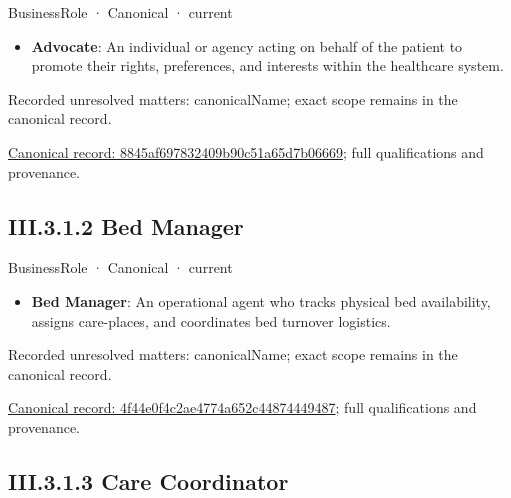 \label{element:8845af697832409b90c51a65d7b06669}
{\small BusinessRole · Canonical · current}\par

\begin{itemize}


\item \textbf{Advocate}: An individual or agency acting on behalf of the patient to promote their rights, preferences, and interests within the healthcare system.

\end{itemize}

{\small Recorded unresolved matters: canonicalName; exact scope remains in the canonical record.}\par
{\footnotesize \href{../../../../continuum/business/business-role/8845af697832409b90c51a65d7b06669.md}{Canonical record: 8845af697832409b90c51a65d7b06669}; full qualifications and provenance.}\par
\subsection*{III.3.1.2 Bed Manager}
\label{navigation:III.3.1.2}

\label{element:4f44e0f4c2ae4774a652c44874449487}
{\small BusinessRole · Canonical · current}\par

\begin{itemize}


\item \textbf{Bed Manager}: An operational agent who tracks physical bed availability, assigns care-places, and coordinates bed turnover logistics.

\end{itemize}

{\small Recorded unresolved matters: canonicalName; exact scope remains in the canonical record.}\par
{\footnotesize \href{../../../../continuum/business/business-role/4f44e0f4c2ae4774a652c44874449487.md}{Canonical record: 4f44e0f4c2ae4774a652c44874449487}; full qualifications and provenance.}\par
\subsection*{III.3.1.3 Care Coordinator}
\label{navigation:III.3.1.3}

